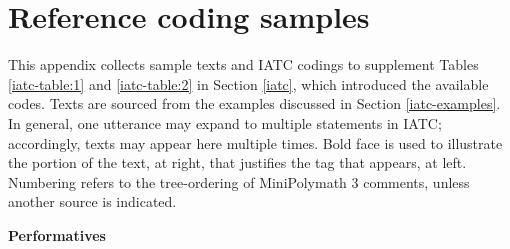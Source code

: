 \documentclass[smallextended,oneside]{svjour3}       %
\begin{document}
{\clearpage
\appendix
\section{Reference coding samples} \label{app:reference-coding-samples}
This appendix collects sample texts and IATC codings to
supplement Tables \ref{iatc-table:1} and \ref{iatc-table:2} in Section
\ref{iatc}, which introduced the available codes.  Texts are sourced from the
examples discussed in Section \ref{iatc-examples}.    In general, one utterance may
expand to multiple statements in IATC; accordingly, texts may
appear here multiple times.  Bold face is used to illustrate the
portion of the text, at right, that justifies the tag that appears, at
left.   Numbering refers
to the tree-ordering of MiniPolymath 3 comments, unless another source
is indicated.

\medskip

{\centering
\textbf{Performatives} 

\par}
\medskip


}
\end{document}
